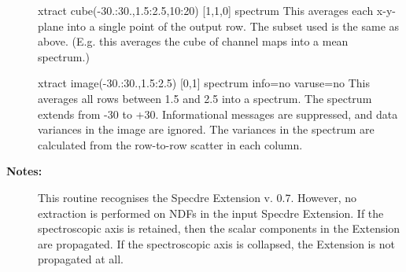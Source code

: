 \begin{description}
\begin{terminalv}
xtract cube(-30.:30.,1.5:2.5,10:20) [1,1,0] spectrum
   This averages each x-y-plane into a single point of the output
   row. The subset used is the same as above. (E.g. this averages
   the cube of channel maps into a mean spectrum.)

xtract image(-30.:30.,1.5:2.5) [0,1] spectrum info=no varuse=no
   This averages all rows between 1.5 and 2.5 into a spectrum. The
   spectrum extends from -30 to +30. Informational messages are
   suppressed, and data variances in the image are ignored. The
   variances in the spectrum are calculated from the row-to-row
   scatter in each column.
\end{terminalv}

\item [\textbf{Notes:}]
This routine recognises the Specdre Extension v. 0.7. However, no
extraction is performed on NDFs in the input Specdre Extension. If
the spectroscopic axis is retained, then the scalar components in
the Extension are propagated. If the spectroscopic axis is
collapsed, the Extension is not propagated at all.
\end{description}
